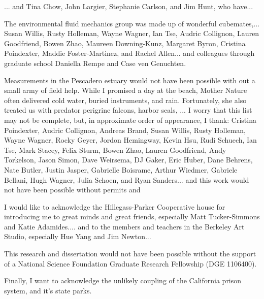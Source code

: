 

... and Tina Chow, John Largier, Stephanie Carlson, and Jim Hunt, who have... 

The environmental fluid mechanics group was made up of wonderful cubemates,... Susan Willis, Rusty Holleman, Wayne Wagner, Ian Tse, Audric Collignon, Lauren Goodfriend, Bowen Zhao, Maureen Downing-Kunz, Margaret Byron, Cristina Poindexter, Maddie Foster-Martinez, and Rachel Allen... and colleagues through graduate school Daniella Rempe and Case ven Genuchten. 

Measurements in the Pescadero estuary would not have been possible with out a small army of field help. While I promised a day at the beach, Mother Nature often delivered cold water, buried instruments, and rain. Fortunately, she also treated us with predator perigrine falcons, harbor seals, ... I worry that this list may not be complete, but, in approximate order of appearance, I thank: Cristina Poindexter, Audric Collignon, Andreas Brand, Susan Willis, Rusty Holleman, Wayne Wagner, Rocky Geyer, Jordon Hemingway, Kevin Hsu, Rudi Schuech, Ian Tse, Mark Stacey, Felix Sturm, Bowen Zhao, Lauren Goodfriend, Andy Torkelson, Jason Simon, Dave Weirsema, DJ Gaker, Eric Huber, Dane Behrens, Nate Butler, Justin Jasper, Gabrielle Boisrame, Arthur Wiedmer, Gabriele Bellani, Hugh Wagner, Julia Schoen, and Ryan Sanders... and this work would not have been possible without permits and 

I would like to acknowledge the Hillegass-Parker Cooperative house for introducing me to great minds and great friends, especially Matt Tucker-Simmons and Katie Adamides.... and to the members and teachers in the Berkeley Art Studio, especially Hue Yang and Jim Newton...

This research and dissertation would not have been possible without the support of a National Science Foundation Graduate Research Fellowship (DGE 1106400).

Finally, I want to acknowledge the unlikely coupling of the California prison system, and it's state parks. 